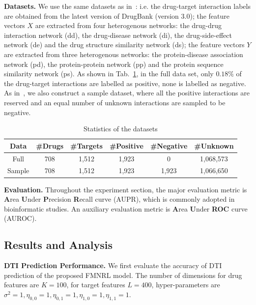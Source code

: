\documentclass[sigconf,anonymous]{acmart}
\begin{document}
\textbf{Datasets.} %
We use the same datasets as in~\cite{Luo2017Network}: i.e. the drug-target interaction labels are obtained from the latest version of DrugBank (version 3.0); the feature vectors $X$ are extracted from four heterogenous networks: the drug-drug interaction network (dd), the drug-disease network (di), the drug-side-effect network (de) and the drug structure similarity network (ds); the feature vectors $Y$ are extracted from three heterogenous networks: the protein-disease association network (pd), the protein-protein network (pp) and the protein sequence similarity network (ps). As shown in Tab.~\ref{tab:data}, in the full data set, only $0.18\%$ of the drug-target interactions are labelled as positive, none is labelled as negative. As in~\cite{Luo2017Network}, we also construct a sample dataset, where all the positive interactions are reserved and an equal number of unknown interactions are sampled to be negative.
\begin{table}[htp]
\caption{Statistics of the datasets}\label{tab:data}
\vspace*{-10pt}
\begin{tabular}{|c|c|c|c|c|c|}
\hline
Data & \#Drugs & \#Targets & \#Positive & \#Negative & \#Unknown \\\hline
Full & 708 & 1,512 & 1,923 & 0 & 1,068,573 \\\hline
Sample & 708 & 1,512 & 1,923 & 1,923 & 1,066,650 \\\hline
\end{tabular}
\vspace*{-5pt}
\end{table}%



\textbf{Evaluation.} Throughout the experiment section, the major evaluation metric is \textbf{A}rea \textbf{U}nder \textbf{P}recision \textbf{R}ecall curve (AUPR), which is commonly adopted in bioinformatic studies. An auxiliary evaluation metric is \textbf{A}rea \textbf{U}nder \textbf{ROC} curve (AUROC).

\subsection{Results and Analysis}
\textbf{DTI Prediction Performance.} We first evaluate the accuracy of DTI prediction of the proposed FMNRL model. The number of dimensions for drug features are $K=100$, for target features $L=400$, hyper-parameters are $\sigma^2=1,\eta_{0,0}=1,\eta_{0,1}=1,\eta_{1,0}=1,\eta_{1,1}=1$. 
\end{document}
